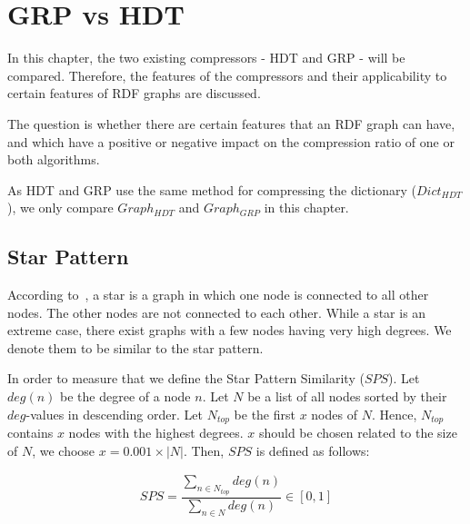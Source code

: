 \section{GRP vs HDT}\label{sec:approachGRPvsHDT}

In this chapter, the two existing compressors - HDT and GRP - will be compared. Therefore, the features of the compressors and their applicability to certain features of RDF graphs are discussed.

The question is whether there are certain features that an RDF graph can have, and which have a positive or negative impact on the compression ratio of one or both algorithms. 

As HDT and GRP use the same method for compressing the dictionary ($Dict_{HDT}$), we only compare $Graph_{HDT}$ and $Graph_{GRP}$ in this chapter.



\subsection{Star Pattern}\label{sec:approachStarPattern}

According to~\cite{stargraph}, a star is a graph in which one node is connected to all other nodes. The other nodes are not connected to each other. While a star is an extreme case, there exist graphs with a few nodes having very high degrees. We denote them to be similar to the star pattern. 

In order to measure that we define the Star Pattern Similarity ($SPS$). Let $deg(n)$ be the degree of a node $n$. Let $N$ be a list of all nodes sorted by their $deg$-values in descending order.  Let $N_{top}$ be the first $x$ nodes of $N$. Hence, $N_{top}$ contains $x$ nodes with the highest degrees. $x$ should be chosen related to the size of $N$, we choose $x=0.001 \times |N|$.  Then, $SPS$ is defined as follows:

\begin{align*}
SPS=\dfrac{\sum_{n \in N_{top}} deg(n)  }{\sum_{n \in N} deg(n)} \in [0,1]
\end{align*}

